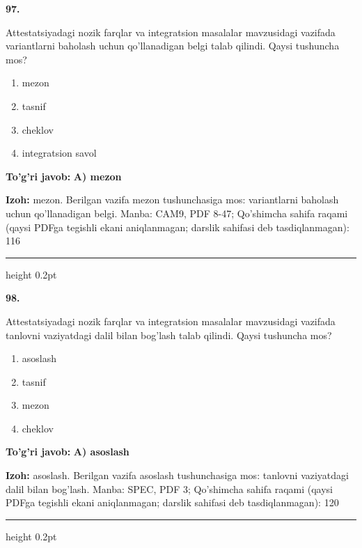 \documentclass[10pt,a4paper]{article}
\begin{document}
{\bfseries\sffamily\color{ink} 97.}
\par
Attestatsiyadagi nozik farqlar va integratsion masalalar mavzusidagi vazifada variantlarni baholash uchun qo'llanadigan belgi talab qilindi. Qaysi tushuncha mos?
\begin{enumerate}[label=\Alph*),leftmargin=9mm]
\item mezon
\item tasnif
\item cheklov
\item integratsion savol
\end{enumerate}
\begin{tcolorbox}[enhanced,breakable,colback=teal!4,colframe=teal!60!black,boxrule=0.45pt,arc=1.2mm,left=2.7mm,right=2.7mm,top=1.8mm,bottom=1.8mm,before skip=2mm,after skip=2mm]
{\bfseries\sffamily\color{teal}To'g'ri javob:} \textbf{A) mezon}
\par\smallskip
{\bfseries Izoh:} mezon. Berilgan vazifa mezon tushunchasiga mos: variantlarni baholash uchun qo'llanadigan belgi. Manba: CAM9, PDF 8-47; Qo'shimcha sahifa raqami (qaysi PDFga tegishli ekani aniqlanmagan; darslik sahifasi deb tasdiqlanmagan): 116
\end{tcolorbox}
\vspace{2mm}\hrule height 0.2pt\vspace{3mm}

{\bfseries\sffamily\color{ink} 98.}
\par
Attestatsiyadagi nozik farqlar va integratsion masalalar mavzusidagi vazifada tanlovni vaziyatdagi dalil bilan bog'lash talab qilindi. Qaysi tushuncha mos?
\begin{enumerate}[label=\Alph*),leftmargin=9mm]
\item asoslash
\item tasnif
\item mezon
\item cheklov
\end{enumerate}
\begin{tcolorbox}[enhanced,breakable,colback=teal!4,colframe=teal!60!black,boxrule=0.45pt,arc=1.2mm,left=2.7mm,right=2.7mm,top=1.8mm,bottom=1.8mm,before skip=2mm,after skip=2mm]
{\bfseries\sffamily\color{teal}To'g'ri javob:} \textbf{A) asoslash}
\par\smallskip
{\bfseries Izoh:} asoslash. Berilgan vazifa asoslash tushunchasiga mos: tanlovni vaziyatdagi dalil bilan bog'lash. Manba: SPEC, PDF 3; Qo'shimcha sahifa raqami (qaysi PDFga tegishli ekani aniqlanmagan; darslik sahifasi deb tasdiqlanmagan): 120
\end{tcolorbox}
\vspace{2mm}\hrule height 0.2pt\vspace{3mm}
\end{document}

